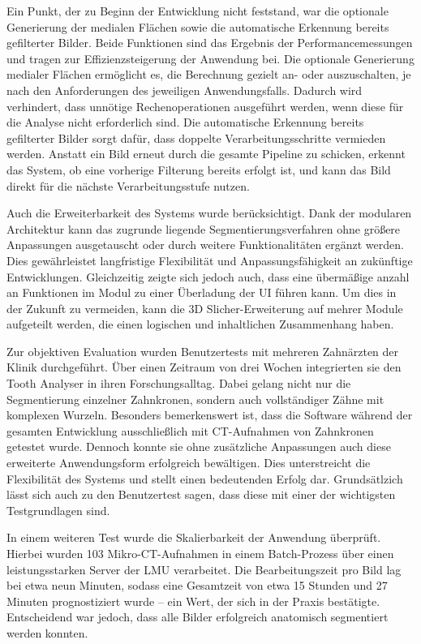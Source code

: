 Ein Punkt, der zu Beginn der Entwicklung nicht feststand, war die optionale
Generierung der medialen Flächen sowie die automatische Erkennung bereits
gefilterter Bilder. Beide Funktionen sind das Ergebnis der Performancemessungen und
tragen zur Effizienzsteigerung der Anwendung bei. Die optionale Generierung
medialer Flächen ermöglicht es, die Berechnung gezielt an- oder auszuschalten, je
nach den Anforderungen des jeweiligen Anwendungsfalls. Dadurch wird verhindert, dass
unnötige Rechenoperationen ausgeführt werden, wenn diese für die Analyse nicht
erforderlich sind. Die automatische Erkennung bereits gefilterter Bilder sorgt dafür,
dass doppelte Verarbeitungsschritte vermieden werden. Anstatt ein Bild erneut durch
die gesamte Pipeline zu schicken, erkennt das System, ob eine vorherige Filterung
bereits erfolgt ist, und kann das Bild direkt für die nächste Verarbeitungsstufe
nutzen.

Auch die Erweiterbarkeit des Systems wurde berücksichtigt. Dank der modularen Architektur
kann das zugrunde liegende Segmentierungsverfahren ohne größere Anpassungen ausgetauscht
oder durch weitere Funktionalitäten ergänzt werden. Dies gewährleistet
langfristige Flexibilität und Anpassungsfähigkeit an zukünftige Entwicklungen. Gleichzeitig
zeigte sich jedoch auch, dass eine übermäßige anzahl an Funktionen im Modul zu
einer Überladung der \ac{UI} führen kann. Um dies in der Zukunft zu vermeiden, kann
die 3D Slicher-Erweiterung auf mehrer Module aufgeteilt werden, die einen
logischen und inhaltlichen Zusammenhang haben.

Zur objektiven Evaluation wurden Benutzertests mit mehreren Zahnärzten der
Klinik durchgeführt. Über einen Zeitraum von drei Wochen integrierten sie den Tooth
Analyser in ihren Forschungsalltag. Dabei gelang nicht nur die Segmentierung
einzelner Zahnkronen, sondern auch vollständiger Zähne mit komplexen Wurzeln.
Besonders bemerkenswert ist, dass die Software während der gesamten Entwicklung ausschließlich
mit CT-Aufnahmen von Zahnkronen getestet wurde. Dennoch konnte sie ohne
zusätzliche Anpassungen auch diese erweiterte Anwendungsform erfolgreich
bewältigen. Dies unterstreicht die Flexibilität des Systems und stellt einen bedeutenden
Erfolg dar. Grundsätlzich lässt sich auch zu den Benutzertest sagen, dass diese mit
einer der wichtigsten Testgrundlagen sind.

In einem weiteren Test wurde die Skalierbarkeit der Anwendung überprüft. Hierbei
wurden 103 Mikro-CT-Aufnahmen in einem Batch-Prozess über einen leistungsstarken
Server der LMU verarbeitet. Die Bearbeitungszeit pro Bild lag bei etwa neun Minuten,
sodass eine Gesamtzeit von etwa 15 Stunden und 27 Minuten prognostiziert wurde –
ein Wert, der sich in der Praxis bestätigte. Entscheidend war jedoch, dass alle Bilder
erfolgreich anatomisch segmentiert werden konnten.

